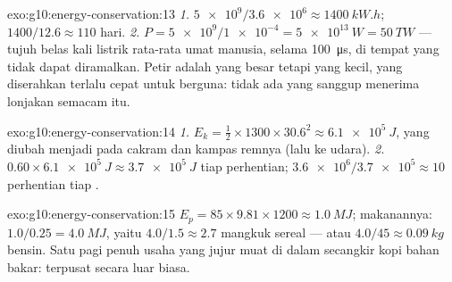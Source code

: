 \begin{solution}{exo:g10:energy-conservation:13}
\emph{1.} $\num{5e9}/\num{3.6e6} \approx \qty{1400}{kW.h}$;
$1400/12.6 \approx 110$ hari.
\emph{2.} $P = \num{5e9}/\num{1e-4} = \qty{5e13}{W} = \qty{50}{TW}$
--- tujuh belas kali  listrik rata-rata umat manusia, selama
\qty{100}{\micro s}, di tempat yang tidak dapat diramalkan. Petir
adalah  yang besar tetapi  yang kecil, yang diserahkan
terlalu cepat untuk berguna: tidak ada  yang sanggup menerima
lonjakan semacam itu.
\end{solution}

\begin{solution}{exo:g10:energy-conservation:14}
\emph{1.} $E_k = \tfrac12 \times 1300 \times 30.6^2 \approx
\qty{6.1e5}{J}$, yang diubah menjadi  pada cakram dan
kampas remnya (lalu ke udara).
\emph{2.} $0.60 \times \qty{6.1e5}{J} \approx \qty{3.7e5}{J}$ tiap
perhentian; $\num{3.6e6}/\num{3.7e5} \approx 10$ perhentian tiap
.
\end{solution}

\begin{solution}{exo:g10:energy-conservation:15}
$E_p = 85 \times 9.81 \times 1200 \approx \qty{1.0}{MJ}$; makanannya:
$1.0/0.25 = \qty{4.0}{MJ}$, yaitu $4.0/1.5 \approx 2.7$ mangkuk sereal
--- atau $4.0/45 \approx \qty{0.09}{kg}$ bensin. Satu pagi penuh usaha
yang jujur muat di dalam secangkir kopi bahan bakar: 
terpusat secara luar biasa.
\end{solution}

